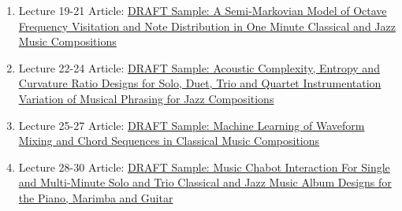 \documentclass{TMLSStyleGuideResumeVitae}
\begin{document}
\begin{enumerate}
\item Lecture 19-21 Article: \href{https://github.com/MathematicalLearningSpace/Reading-Room-A/blob/master/Classroom%20Lecture%20Model%20Series_Course_4_Topic%201_Lecture_19_20_21_Journal_Article_7.tex}{DRAFT Sample: A Semi-Markovian Model of Octave Frequency Visitation and Note Distribution in One Minute Classical and Jazz Music Compositions}
\item Lecture 22-24 Article: \href{https://github.com/MathematicalLearningSpace/Reading-Room-A/blob/master/Classroom%20Lecture%20Model%20Series_Course_4_Topic%201_Lecture_22_23_24_Journal_Article_8.tex}{DRAFT Sample: Acoustic Complexity, Entropy and Curvature Ratio Designs for Solo, Duet, Trio and Quartet Instrumentation Variation of Musical Phrasing for Jazz Compositions}
\item Lecture 25-27 Article: \href{https://github.com/MathematicalLearningSpace/Reading-Room-A/blob/master/Classroom%20Lecture%20Model%20Series_Course_4_Topic%201_Lecture_25_26_27_Journal_Article_9.tex}{DRAFT Sample: Machine Learning of Waveform Mixing and Chord Sequences in Classical Music Compositions}
\item Lecture 28-30 Article: \href{https://github.com/MathematicalLearningSpace/Reading-Room-A/blob/master/Classroom%20Lecture%20Model%20Series_Course_4_Topic%201_Lecture_28_29_30_Journal_Article_10.tex}{DRAFT Sample: Music Chabot Interaction For Single and Multi-Minute Solo and Trio Classical and Jazz Music Album Designs for the Piano, Marimba and Guitar}
\end{enumerate}
\end{document}
